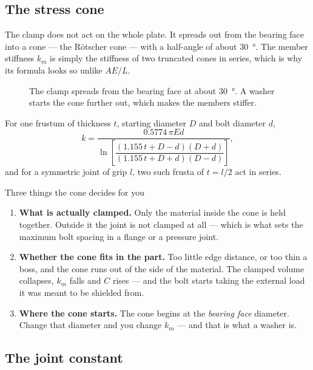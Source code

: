 \documentclass[11pt,a4paper]{article}
\begin{document}
\subsection{The stress cone}

The clamp does not act on the whole plate. It spreads out from the bearing face into a cone --- the
R\"otscher cone --- with a half-angle of about \SI{30}{\degree}. The member stiffness $k_m$ is simply
the stiffness of two truncated cones in series, which is why its formula looks so unlike $AE/L$.

\begin{figure}[H]\centering
\resizebox{0.95\textwidth}{!}{}
\caption{The clamp spreads from the bearing face at about \SI{30}{\degree}. A washer starts the cone
further out, which makes the members stiffer.}
\end{figure}

For one frustum of thickness $t$, starting diameter $D$ and bolt diameter $d$,
\[
k = \frac{0.5774\,\pi E d}
{\ln\!\left[\dfrac{(1.155\,t + D - d)(D + d)}{(1.155\,t + D + d)(D - d)}\right]},
\]
and for a symmetric joint of grip $l$, two such frusta of $t=l/2$ act in series.

\begin{keybox}{Three things the cone decides for you}
\begin{enumerate}[nosep]
  \item \textbf{What is actually clamped.} Only the material inside the cone is held together. Outside
        it the joint is not clamped at all --- which is what sets the maximum bolt spacing in a flange
        or a pressure joint.
  \item \textbf{Whether the cone fits in the part.} Too little edge distance, or too thin a boss, and
        the cone runs out of the side of the material. The clamped volume collapses, $k_m$ falls and
        $C$ rises --- and the bolt starts taking the external load it was meant to be shielded from.
  \item \textbf{Where the cone starts.} The cone begins at the \emph{bearing face} diameter. Change
        that diameter and you change $k_m$ --- and that is what a washer is.
\end{enumerate}
\end{keybox}

\subsection{The joint constant}\label{sec:joint}
\end{document}

